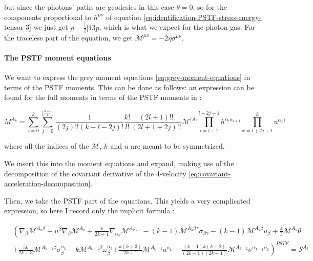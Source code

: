 \documentclass[main.tex]{subfiles}
\begin{document}
but since the photons' paths are geodesics in this case \(\theta = 0\), so for the components proportional to \(h^{\mu\nu}\) of equation \eqref{eq:identification-PSTF-stress-energy-tensor-3} we just get \(\rho = \frac[i]{1}{3} p\), which is what we expect for the photon gas.
For the traceless part of the equation, we get \(\mathscr M ^{\mu\nu} = -2 \eta \sigma^{\mu\nu}\).

\paragraph{The PSTF moment equations}

We want to express the grey moment equations \eqref{eq:grey-moment-equations} in terms of the PSTF moments. This can be done as follows: an expression can be found for the full moments in terms of the PSTF moments in \cite[eq. 4.10c]{Thorne:1981feb}:

\begin{equation}
  M^{A_k} = \sum_{l=0}^k \sum_{j=0}^{\lfloor \frac{k-l}{2} \rfloor}
  \frac{1}{(2j)!! (k-l-2j)!}  \frac{k!}{l!} \frac{(2l+1)!!}{(2l+1+2j)!!}
  \mathscr M^{(A_l} \prod_{i=l+1}^{l+2j-1} h^{\alpha_i \alpha_{i+1}}
  \prod_{x=l+2j+1}^k u^{\alpha_x)}
\end{equation}

where all the indices of the \(\mathscr M\), \(h\) and \(u\) are meant to be symmetrized.

We insert this into the moment equations and expand, making use of the decomposition of the covariant derivative of the 4-velocity \eqref{eq:covariant-acceleration-decomposition}.

Then, we take the PSTF part of the equations. This yields a very complicated expression, so here I record only the implicit formula \cite[eq. 4.11c]{Thorne:1981feb}:

\begin{equation} \label{eq:PSTF-grey-moment-equations}
  \begin{split}
    &\left( \nabla _\beta \mathscr M ^{A_k \beta} + u^\beta \nabla_\beta \mathscr M ^{A_k}
    + \frac{k}{2k+1} \nabla_{\alpha_k} \mathscr M ^{A_{k-1}}
    - (k-1) \mathscr M ^{A_k \beta \gamma} \sigma_{\beta \gamma} \right.
    - (k-1) \mathscr M ^{A_k \beta} a_\beta
    + \frac{4}{3} \mathscr M ^{A_k} \theta \\
    &+ \frac{5k}{2k+3} \mathscr M ^{A_{k-1} \beta} \sigma_\beta^{\alpha_k}
    - k \mathscr M ^{A_{k-1} \beta} \omega_\beta ^{\alpha_k}
    \left.+ \frac{k (k+3)}{2k+1} \mathscr M ^{A_{k-1}} a^{\alpha_k}
    + \frac{(k-1) k (k+2) }{(2k-1) (2k+1)} \mathscr M ^{A_{k-2}} \sigma^{\alpha_{k-1} \alpha_k} \right)^{PSTF} = \mathscr S ^{A_k}
  \end{split}
\end{equation}
\end{document}

